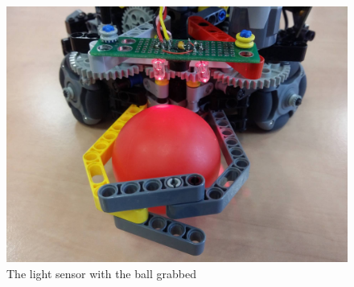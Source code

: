 \documentclass[a4paper,12pt]{article}
\begin{document}
\begin{figure}[ht!]
\centering
\includegraphics[scale=.1]{sensor1}
\caption{The light sensor with the ball grabbed}
\label{fig:sensor}
\end{figure}
\end{document}
